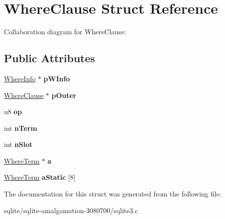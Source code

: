 \hypertarget{struct_where_clause}{\section{Where\+Clause Struct Reference}
\label{struct_where_clause}
}


Collaboration diagram for Where\+Clause\+:
\subsection*{Public Attributes}
\begin{DoxyCompactItemize}
\item 
\hypertarget{struct_where_clause_a40045b5806b481237c7fc4c0e21cd29b}{\hyperlink{struct_where_info}{Where\+Info} $\ast$ {\bfseries p\+W\+Info}}\label{struct_where_clause_a40045b5806b481237c7fc4c0e21cd29b}

\item 
\hypertarget{struct_where_clause_a6f72d61f416a323f39a8d3e2be62f607}{\hyperlink{struct_where_clause}{Where\+Clause} $\ast$ {\bfseries p\+Outer}}\label{struct_where_clause_a6f72d61f416a323f39a8d3e2be62f607}

\item 
\hypertarget{struct_where_clause_a7a56a5fe1ab6603e930f3b5372ff2f71}{u8 {\bfseries op}}\label{struct_where_clause_a7a56a5fe1ab6603e930f3b5372ff2f71}

\item 
\hypertarget{struct_where_clause_ab84924c3c78af1ab387ab3919c5031c4}{int {\bfseries n\+Term}}\label{struct_where_clause_ab84924c3c78af1ab387ab3919c5031c4}

\item 
\hypertarget{struct_where_clause_ac92b93d65d4c3d9216707a049a4edb1c}{int {\bfseries n\+Slot}}\label{struct_where_clause_ac92b93d65d4c3d9216707a049a4edb1c}

\item 
\hypertarget{struct_where_clause_a140d726a3e20ac7b6853d539c59add72}{\hyperlink{struct_where_term}{Where\+Term} $\ast$ {\bfseries a}}\label{struct_where_clause_a140d726a3e20ac7b6853d539c59add72}

\item 
\hypertarget{struct_where_clause_a4acb8640bc9f42752900de5735bcd8e0}{\hyperlink{struct_where_term}{Where\+Term} {\bfseries a\+Static} \mbox{[}8\mbox{]}}\label{struct_where_clause_a4acb8640bc9f42752900de5735bcd8e0}

\end{DoxyCompactItemize}


The documentation for this struct was generated from the following file\+:\begin{DoxyCompactItemize}
\item 
sqlite/sqlite-\/amalgamation-\/3080700/sqlite3.\+c\end{DoxyCompactItemize}
